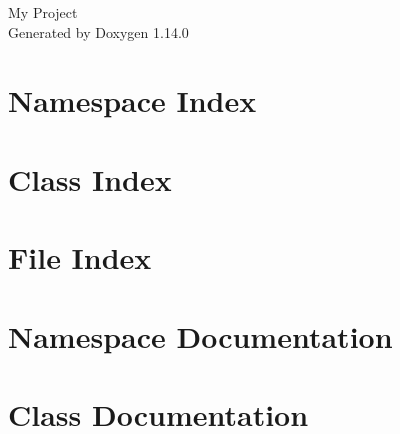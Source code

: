 \documentclass[twoside]{book}
\newcommand{\+}{\discretionary{\mbox{\scriptsize$\hookleftarrow$}}{}{}}
\newcommand{\clearemptydoublepage}{%
    \newpage{\pagestyle{empty}\cleardoublepage}%
  }
\begin{document}
  \raggedbottom
    \hypersetup{pageanchor=false,
                bookmarksnumbered=true,
                pdfencoding=unicode
               }
  \begin{titlepage}
  \vspace*{7cm}
  \begin{center}%
  {\Large My Project}\\
  \vspace*{1cm}
  {\large Generated by Doxygen 1.14.0}\\
  \end{center}
  \end{titlepage}
  \clearemptydoublepage
  \tableofcontents
  \clearemptydoublepage
  \hypersetup{pageanchor=true}
\chapter{Namespace Index}

\chapter{Class Index}

\chapter{File Index}

\chapter{Namespace Documentation}



\chapter{Class Documentation}































\end{document}
